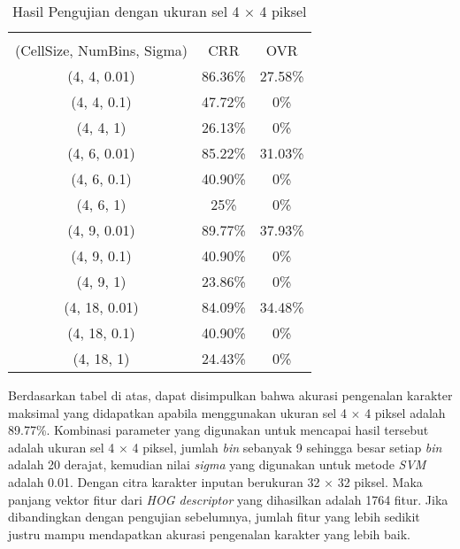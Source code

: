 \begin{longtable}[c]{|c|c|c|}
	\caption{Hasil Pengujian dengan ukuran sel 4 $\times$ 4 piksel}
	\label{tab:HasilPengujianSel4}\\
	\hline
	\begin{tabular}[c]{@{}c@{}}Parameter\\ (CellSize, NumBins, Sigma)\end{tabular} & CRR     & OVR     \\ \hline
	\endhead
	(4, 4, 0.01)                                                                   & 86.36\% & 27.58\% \\ \hline
	(4, 4, 0.1)                                                                    & 47.72\% & 0\%     \\ \hline
	(4, 4, 1)                                                                      & 26.13\% & 0\%     \\ \hline
	(4, 6, 0.01)                                                                   & 85.22\% & 31.03\%  \\ \hline
	(4, 6, 0.1)                                                                    & 40.90\% & 0\%     \\ \hline
	(4, 6, 1)                                                                      & 25\%    & 0\%     \\ \hline
	(4, 9, 0.01)                                                                   & {\color[HTML]{FE0000} 89.77\%} & {\color[HTML]{FE0000} 37.93\%}  \\ \hline
	(4, 9, 0.1)                                                                    & 40.90\% & 0\%     \\ \hline
	(4, 9, 1)                                                                      & 23.86\% & 0\%     \\ \hline
	(4, 18, 0.01)                                                                  & 84.09\% & 34.48\%  \\ \hline
	(4, 18, 0.1)                                                                   & 40.90\% & 0\%     \\ \hline
	(4, 18, 1)                                                                     & 24.43\% & 0\%     \\ \hline
\end{longtable}
\noindent Berdasarkan tabel di atas, dapat disimpulkan bahwa akurasi pengenalan karakter maksimal yang didapatkan apabila menggunakan ukuran sel 4 $\times$ 4 piksel adalah 89.77\%. Kombinasi parameter yang digunakan untuk mencapai hasil tersebut adalah ukuran sel 4 $\times$ 4 piksel, jumlah \textit{bin} sebanyak 9 sehingga besar setiap \textit{bin} adalah 20 derajat, kemudian nilai \textit{sigma} yang digunakan untuk metode \textit{SVM} adalah 0.01. Dengan citra karakter inputan berukuran 32 $\times$ 32 piksel. Maka panjang vektor fitur dari \textit{HOG descriptor} yang dihasilkan adalah 1764 fitur. Jika dibandingkan dengan pengujian sebelumnya, jumlah fitur yang lebih sedikit justru mampu mendapatkan akurasi pengenalan karakter yang lebih baik.

